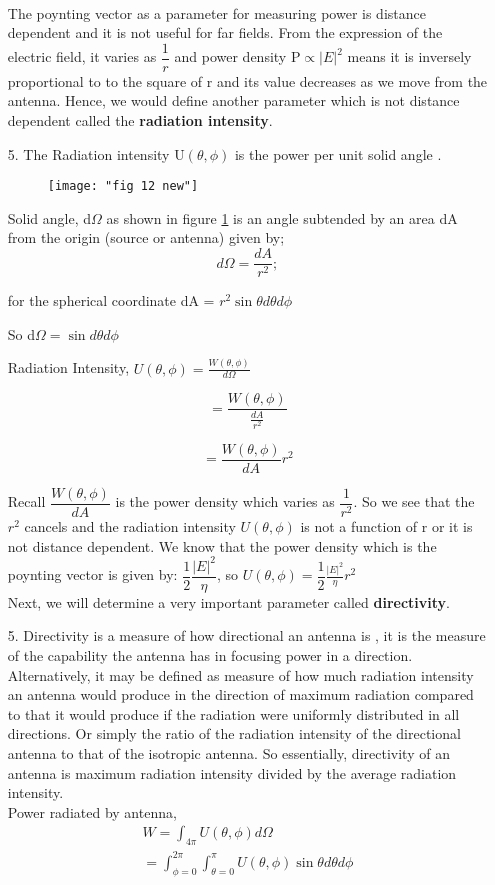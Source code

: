 \begin{enumerate}
	\paragraph{}
	The poynting vector as a parameter for measuring power is distance dependent and it is not useful for far fields. From the expression of the electric field, it varies as $\dfrac{1}{r}$ and power density P$\propto |E|^{2}$ means it is inversely proportional to to the square of  r and its value decreases as we move from the antenna. Hence, we would define another parameter which is not distance dependent called the \textbf{radiation intensity}.
	\item[5.] The Radiation intensity U$(\theta, \phi)$ is the power per unit solid angle .
	
	\begin{figure}[h]
		\centering
		\texttt{[image: "fig 12 new"]}
		\label{figure12}
	\end{figure}
	
	
	Solid angle, d$\Omega$ as shown in figure \ref{figure12} is an angle subtended by an area dA from the origin (source or antenna) given by;$$d\Omega=\frac{dA}{r^{2}};$$
	
	for the spherical coordinate dA = $r^{2}\sin \theta d\theta d\phi$
	
	So d$\Omega=\sin d\theta d\phi$
	
	Radiation Intensity, $U(\theta ,\phi) = \frac{W(\theta,\phi)}{d\Omega}$
	
	$$= \frac{W(\theta ,\phi)}{\frac{dA}{r^{2}}}$$
	
	$$= \frac{W(\theta ,\phi)}{dA} r^{2}$$
	
	Recall $\dfrac{W(\theta ,\phi)}{dA}$ is the power density which varies as $\dfrac{1}{r^{2}}$. So we see that the $r^{2}$ cancels and the radiation intensity $U(\theta ,\phi)$ is not a function of r or it is not distance dependent.
	We know that the power density which is the poynting vector is given by: $\dfrac{1}{2}\dfrac{|E|^{2}}{\eta}$, so $U(\theta ,\phi)=\dfrac{1}{2}\frac{|E|^{2}}{\eta}r^{2}$\\
	Next, we will determine a very important parameter called \textbf{directivity}.
	\item[5.] Directivity is a measure of how directional an antenna is , it is the measure of the capability the antenna has in focusing power in a direction. Alternatively, it may be defined as measure of how much radiation intensity an antenna would produce in the direction of maximum radiation compared to that it would produce if the radiation were uniformly distributed in all directions. Or simply the ratio of the radiation intensity of the directional antenna to that of the isotropic antenna.
	So essentially, directivity of an antenna  is maximum radiation intensity  divided by the average radiation intensity.\\
	Power radiated by antenna,
	\begin{align*}
	W=\int_{4\pi}U(\theta ,\phi)d\Omega\\
	 =\int_{\phi=0}^{2\pi}\int_{\theta=0}^{\pi}U(\theta,\phi)\sin\theta d\theta d\phi
	\end{align*}
	

\end{enumerate}
